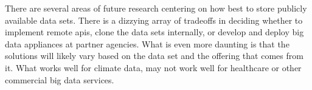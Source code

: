 There are several areas of future research centering on how best to store publicly available data sets. There is a dizzying array of tradeoffs in deciding whether to implement remote \gls{api}s, clone the data sets internally, or develop and deploy big data appliances at partner agencies. What is even more daunting is that the solutions will likely vary based on the data set and the offering that comes from it. What works well for climate data, may not work well for healthcare or other commercial big data services.\\